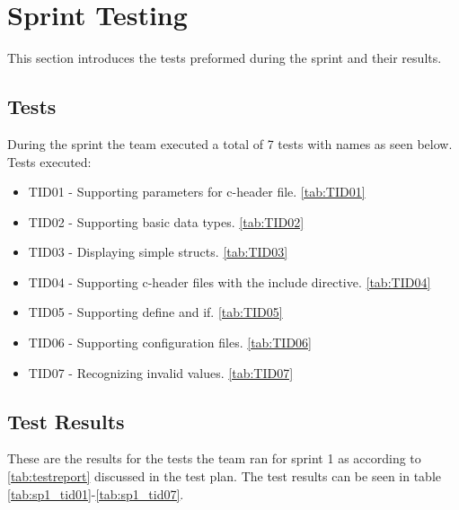 \section{Sprint Testing}
This section introduces the tests preformed during the sprint and their
results.

\subsection{Tests}
During the sprint the team executed a total of 7 tests with names as seen
below. Tests executed:
\begin{itemize}
	\item TID01 - Supporting parameters for \Gls{c}-\gls{header} file. \autoref{tab:TID01}
	\item TID02 - Supporting basic data types. \autoref{tab:TID02}
	\item TID03 - Displaying simple \glspl{struct}. \autoref{tab:TID03}
	\item TID04 - Supporting \Gls{c}-\gls{header} files with the \gls{include} directive. \autoref{tab:TID04}
	\item TID05 - Supporting \gls{define} and \gls{if}. \autoref{tab:TID05}
	\item TID06 - Supporting configuration files. \autoref{tab:TID06}
	\item TID07 - Recognizing invalid values. \autoref{tab:TID07}
\end{itemize}

\subsection{Test Results}
These are the results for the tests the team ran for sprint 1 as according to \autoref{tab:testreport} discussed in the test plan.
The test results can be seen in table \ref{tab:sp1_tid01}-\ref{tab:sp1_tid07}.
\begin{table}[!htb] \footnotesize \center
\caption{Supporting parameters for \Gls{c}-\gls{header} file \label{tab:sp1_tid01}}
\noindent{}
\end{table}


